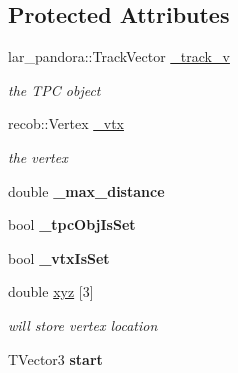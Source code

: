 \subsection*{Protected Attributes}
\begin{DoxyCompactItemize}
\item 
\hypertarget{classubxsec_1_1ACPTAlgo_a1e0563d86cdf1cc41335a409d0e3a23e}{lar\-\_\-pandora\-::\-Track\-Vector \hyperlink{classubxsec_1_1ACPTAlgo_a1e0563d86cdf1cc41335a409d0e3a23e}{\-\_\-track\-\_\-v}}\label{classubxsec_1_1ACPTAlgo_a1e0563d86cdf1cc41335a409d0e3a23e}

\begin{DoxyCompactList}\small\item\em the T\-P\-C object \end{DoxyCompactList}\item 
\hypertarget{classubxsec_1_1ACPTAlgo_a6cafc22e639c105fef51abb5f36ce9b8}{recob\-::\-Vertex \hyperlink{classubxsec_1_1ACPTAlgo_a6cafc22e639c105fef51abb5f36ce9b8}{\-\_\-vtx}}\label{classubxsec_1_1ACPTAlgo_a6cafc22e639c105fef51abb5f36ce9b8}

\begin{DoxyCompactList}\small\item\em the vertex \end{DoxyCompactList}\item 
\hypertarget{classubxsec_1_1ACPTAlgo_a9a5768ec93d755bbf5d301e261266e0d}{double {\bfseries \-\_\-max\-\_\-distance}}\label{classubxsec_1_1ACPTAlgo_a9a5768ec93d755bbf5d301e261266e0d}

\item 
\hypertarget{classubxsec_1_1ACPTAlgo_a71c8e336d951c582195ac97b9038e219}{bool {\bfseries \-\_\-tpc\-Obj\-Is\-Set}}\label{classubxsec_1_1ACPTAlgo_a71c8e336d951c582195ac97b9038e219}

\item 
\hypertarget{classubxsec_1_1ACPTAlgo_a1a7da3296def9462f9a1c6a29046f681}{bool {\bfseries \-\_\-vtx\-Is\-Set}}\label{classubxsec_1_1ACPTAlgo_a1a7da3296def9462f9a1c6a29046f681}

\item 
\hypertarget{classubxsec_1_1ACPTAlgo_aa4d1411847dcdd25774e1d28bb3696bf}{double \hyperlink{classubxsec_1_1ACPTAlgo_aa4d1411847dcdd25774e1d28bb3696bf}{xyz} \mbox{[}3\mbox{]}}\label{classubxsec_1_1ACPTAlgo_aa4d1411847dcdd25774e1d28bb3696bf}

\begin{DoxyCompactList}\small\item\em will store vertex location \end{DoxyCompactList}\item 
\hypertarget{classubxsec_1_1ACPTAlgo_a22dedc31d32d703be93545a8b68fb7c1}{T\-Vector3 {\bfseries start}}\label{classubxsec_1_1ACPTAlgo_a22dedc31d32d703be93545a8b68fb7c1}


\end{DoxyCompactItemize}
